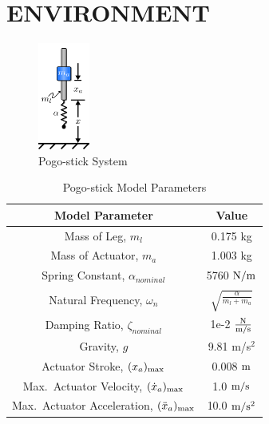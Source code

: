 \documentclass[letterpaper, 10 pt, conference]{ieeeconf}  %
\begin{document}
\section{ENVIRONMENT}
%
\begin{figure}[t]
        \begin{center}
        \includegraphics[width=0.15\textwidth]{figures/Monoped_System/monoped.png}
        \caption{Pogo-stick System}
        \label{fig:pogoStickSystem} 
        \end{center}
\end{figure}
%
\begin{table}[t]
        \caption{Pogo-stick Model Parameters}
        \vspace{-4mm}
        \label{tab:pogoStickSystem}
        \begin{center}
                \begin{tabular}{c c}
                \hline
                \hline
                \textbf{Model Parameter} & \textbf{Value}\\
                \hline
                Mass of Leg, $m_l$                                       & 0.175 kg                                          \\
                Mass of Actuator, $m_a$                                  & 1.003 kg                                          \\
                Spring Constant, $\alpha_{nominal}$                      & 5760 $\textup{N}/\textup{m}$                      \\
                Natural Frequency, $\omega_n$                            & $\sqrt{\frac{\alpha}{m_l + m_a}}$                 \\
                Damping Ratio, $\zeta_{nominal}$                         & 1e-2 $\frac{\textup{N}}{\textup{m/s}}$            \\
                Gravity, $g$                                             & 9.81 m/s$^2$                                      \\
                \hline
                Actuator Stroke, $(x_{a})_{\textup{max}}$                & 0.008 $\textup{m}$                                \\
                Max.\ Actuator Velocity, $(\dot{x}_{a})_{\textup{max}}$  & 1.0 $\textup{m}/\textup{s}$                       \\ 
                Max.\ Actuator Acceleration, $(\ddot{x}_{a})_{\textup{max}}$   & 10.0 $\textup{m}/\textup{s}^2$                    \\
                \hline
                \hline
                \end{tabular}
        \end{center}
\end{table}
\end{document}
